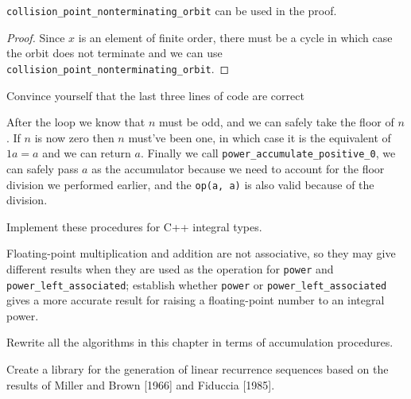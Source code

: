 \begin{lemma}
	\verb|collision_point_nonterminating_orbit| can be used in the proof.
\end{lemma}

\begin{proof}
	Since $x$ is an element of finite order, there must be a cycle in which case the orbit
	does not terminate and we can use \verb|collision_point_nonterminating_orbit|.
\end{proof}

\begin{exercise}
	Convince yourself that the last three lines of code are correct
\end{exercise}

\begin{solution}
	After the loop we know that $n$ must be odd, and we can safely take the
	floor of $n$. If $n$ is now zero then $n$ must've been one, in which case it is the
	equivalent of $1a = a$ and we can return $a$. Finally we call \verb|power_accumulate_positive_0|,
	we can safely pass $a$ as the accumulator because we need to account for the floor division
	we performed earlier, and the \verb|op(a, a)| is also valid because of the division.
\end{solution}

\begin{exercise}
	Implement these procedures for C++ integral types.
\end{exercise}



\begin{project}
	Floating-point multiplication and addition are not associative, so they may give different
	results when they are used as the operation for \verb|power| and \verb|power_left_associated|;
	establish whether \verb|power| or \verb|power_left_associated| gives a more accurate result
	for raising a floating-point number to an integral power.
\end{project}

\begin{exercise}
	Rewrite all the algorithms in this chapter in terms of accumulation procedures.
\end{exercise}

\begin{project}
	Create a library for the generation of linear recurrence sequences based on the results
	of Miller and Brown [1966] and Fiduccia [1985].
\end{project}
